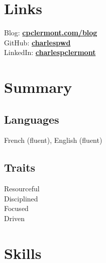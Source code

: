\documentclass[letterpaper]{deedy-resume} %
\begin{document}
\begin{minipage}[t]{0.33\textwidth}
\section{Links}

Blog: \href{http://cpclermont.com/blog}{\bf cpclermont.com/blog} \\
GitHub: \href{https://GitHub.com/charlespwd}{\bf charlespwd} \\
LinkedIn: \href{http://ca.linkedin.com/in/charlespclermont}{\bf charlespclermont} \\

\sectionspace %


\section{Summary}



\subsection{Languages}
French (fluent), English (fluent)

\sectionspace
\subsection{Traits}
  \textbullet{} Resourceful \\
  \textbullet{} Disciplined \\
  \textbullet{} Focused \\
  \textbullet{} Driven \\

\sectionspace

\section{Skills}


\end{minipage}
\end{document}
